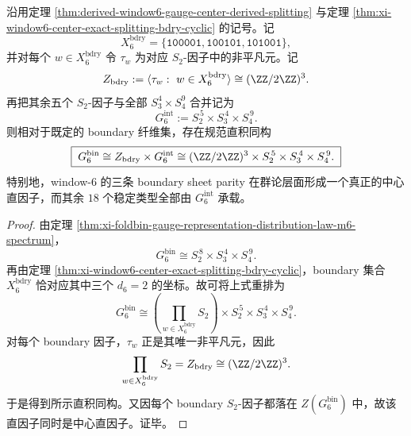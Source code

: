\begin{theorem}\label{thm:derived-window6-boundary-parity-direct-factor-refinement}
沿用定理 \ref{thm:derived-window6-gauge-center-derived-splitting} 与定理 \ref{thm:xi-window6-center-exact-splitting-bdry-cyclic} 的记号。记
\[
X_6^{\mathrm{bdry}}
=
\{\texttt{100001},\texttt{100101},\texttt{101001}\},
\]
并对每个 \(w\in X_6^{\mathrm{bdry}}\) 令 \(\tau_w\) 为对应 \(S_2\)-因子中的非平凡元。记
\[
Z_{\mathrm{bdry}}:=\langle \tau_w:\ w\in X_6^{\mathrm{bdry}}\rangle\cong (\ZZ/2\ZZ)^3.
\]
再把其余五个 \(S_2\)-因子与全部 \(S_3^4\times S_4^9\) 合并记为
\[
G_6^{\mathrm{int}}:=S_2^{\,5}\times S_3^{\,4}\times S_4^{\,9}.
\]
则相对于既定的 boundary 纤维集，存在规范直积同构
\[
\boxed{\;
G_6^{\mathrm{bin}}
\cong
Z_{\mathrm{bdry}}\times G_6^{\mathrm{int}}
\cong
(\ZZ/2\ZZ)^3\times S_2^{\,5}\times S_3^{\,4}\times S_4^{\,9}.\;}
\]
特别地，window-\(6\) 的三条 boundary sheet parity 在群论层面形成一个真正的中心直因子，而其余 \(18\) 个稳定类型全部由 \(G_6^{\mathrm{int}}\) 承载。
\end{theorem}
\begin{proof}
由定理 \ref{thm:xi-foldbin-gauge-representation-distribution-law-m6-spectrum}，
\[
G_6^{\mathrm{bin}}\cong S_2^{\,8}\times S_3^{\,4}\times S_4^{\,9}.
\]
再由定理 \ref{thm:xi-window6-center-exact-splitting-bdry-cyclic}，boundary 集合 \(X_6^{\mathrm{bdry}}\) 恰对应其中三个 \(d_6=2\) 的坐标。故可将上式重排为
\[
G_6^{\mathrm{bin}}\cong
\left(\prod_{w\in X_6^{\mathrm{bdry}}}S_2\right)
\times
S_2^{\,5}\times S_3^{\,4}\times S_4^{\,9}.
\]
对每个 boundary 因子，\(\tau_w\) 正是其唯一非平凡元，因此
\[
\prod_{w\in X_6^{\mathrm{bdry}}}S_2
=
Z_{\mathrm{bdry}}
\cong
(\ZZ/2\ZZ)^3.
\]
于是得到所示直积同构。又因每个 boundary \(S_2\)-因子都落在 \(Z(G_6^{\mathrm{bin}})\) 中，故该直因子同时是中心直因子。证毕。
\end{proof}


